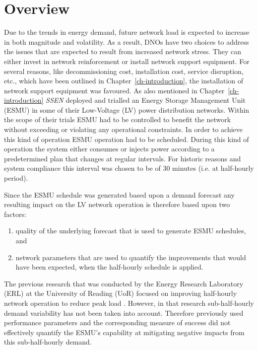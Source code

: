 \section{Overview}
\label{ch1:sec:overview}

Due to the trends in energy demand, future network load is expected to increase in both magnitude and volatility.
As a result, DNOs have two choices to address the issues that are expected to result from increased network stress.
They can either invest in network reinforcement or install network support equipment.
For several reasons, like decommissioning cost, installation cost, service disruption, etc., which have been outlined in Chapter~\ref{ch-introduction}, the installation of network support equipment was favoured.
As also mentioned in Chapter~\ref{ch-introduction} \textit{SSEN} deployed and trialled an Energy Storage Management Unit (ESMU) in some of their Low-Voltage (LV) power distribution networks.
Within the scope of their trials ESMU had to be controlled to benefit the network without exceeding or violating any operational constraints.
In order to achieve this kind of operation ESMU operation had to be scheduled.
During this kind of operation the system either consumes or injects power according to a predetermined plan that changes at regular intervals.
For historic reasons and system compliance this interval was chosen to be of 30 minutes (i.e. at half-hourly period).

Since the ESMU schedule was generated based upon a demand forecast any resulting impact on the LV network operation is therefore based upon two factors:

\begin{enumerate}
	\item quality of the underlying forecast that is used to generate ESMU schedules, and
	\item network parameters that are used to quantify the improvements that would have been expected, when the half-hourly schedule is applied.
\end{enumerate}


The previous research that was conducted by the Energy Research Laboratory (ERL) at the University of Reading (UoR) focused on improving half-hourly network operation to reduce peak load \cite{Rowe2014a, Yunusov2011}.
However, in that research sub-half-hourly demand variability has not been taken into account.
Therefore previously used performance parameters and the corresponding measure of success did not effectively quantify the ESMU's capability at mitigating negative impacts from this sub-half-hourly demand.

